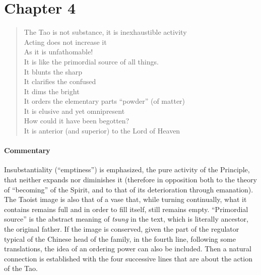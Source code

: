 \section{Chapter 4}

\begin{quotex}
\begin{verse}
The Tao is not substance, it is inexhaustible activity\\ Acting does not increase it\\ As it is unfathomable!\\ It is like the primordial source of all things.\\ It blunts the sharp\\ It clarifies the confused\\ It dims the bright\\ It orders the elementary parts ``powder'' (of matter)\\ It is elusive and yet omnipresent\\ How could it have been begotten?\\ It is anterior (and superior) to the Lord of Heaven
\end{verse}
\end{quotex}


\paragraph{Commentary}


Insubstantiality (``emptiness'') is emphasized, the pure activity of the Principle, that neither expands nor diminishes it (therefore in opposition both to the theory of ``becoming'' of the Spirit, and to that of its deterioration through emanation). The Taoist image is also that of a vase that, while turning continually, what it contains remains full and in order to fill itself, still remains empty. ``Primordial source'' is the abstract meaning of \emph{tsung} in the text, which is literally ancestor, the original father. If the image is conserved, given the part of the regulator typical of the Chinese head of the family, in the fourth line, following some translations, the idea of an ordering power can also be included. Then a natural connection is established with the four successive lines that are about the action of the Tao.


